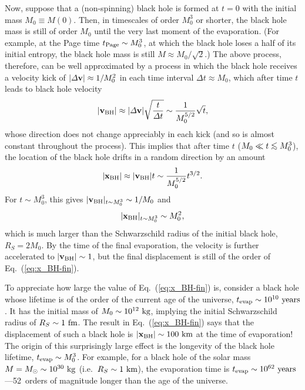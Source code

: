 \documentclass[12pt]{article}
\begin{document}
Now, suppose that a (non-spinning) black hole is formed at $t=0$ with 
the initial mass $M_0 \equiv M(0)$.  Then, in timescales of order $M_0^3$ 
or shorter, the black hole mass is still of order $M_0$ until the very last 
moment of the evaporation.  (For example, at the Page time $t_{\rm Page} 
\sim M_0^3$, at which the black hole loses a half of its initial entropy, 
the black hole mass is still $M \approx M_0/\sqrt{2}$.)  The above process, 
therefore, can be well approximated by a process in which the black hole 
receives a velocity kick of $|\varDelta {\bf v}| \approx 1/M_0^2$ in each 
time interval $\varDelta t \approx M_0$, which after time $t$ leads to 
black hole velocity
%
\begin{equation}
  |{\bf v}_{\rm BH}| \approx |\varDelta {\bf v}| 
    \sqrt{\frac{t}{\varDelta t}} \sim \frac{1}{M_0^{5/2}}\sqrt{t},
\label{eq:v_BH}
\end{equation}
%
whose direction does not change appreciably in each kick (and so is almost 
constant throughout the process).  This implies that after time $t$ ($M_0 
\ll t \simlt M_0^3$), the location of the black hole drifts in a random 
direction by an amount
%
\begin{equation}
  |{\bf x}_{\rm BH}| \approx |{\bf v}_{\rm BH}| t 
    \sim \frac{1}{M_0^{5/2}} t^{3/2}.
\label{eq:x_BH}
\end{equation}
%
For $t \sim M_0^3$, this gives $|{\bf v}_{\rm BH}|_{t \sim M_0^3} \sim 
1/M_0$ and
%
\begin{equation}
  |{\bf x}_{\rm BH}|_{t \sim M_0^3} \sim M_0^2,
\label{eq:x_BH-fin}
\end{equation}
%
which is much larger than the Schwarzschild radius of the initial black 
hole, $R_S = 2M_0$.  By the time of the final evaporation, the velocity 
is further accelerated to $|{\bf v}_{\rm BH}| \sim 1$, but the final 
displacement is still of the order of Eq.~(\ref{eq:x_BH-fin}).

To appreciate how large the value of Eq.~(\ref{eq:x_BH-fin}) is, consider 
a black hole whose lifetime is of the order of the current age of the 
universe, $t_{\rm evap} \sim 10^{10}~{\rm years}$.  It has the initial 
mass of $M_0 \sim 10^{12}~{\rm kg}$, implying the initial Schwarzschild 
radius of $R_S \sim 1~{\rm fm}$.  The result in Eq.~(\ref{eq:x_BH-fin}) 
says that the displacement of such a black hole is $|{\bf x}_{\rm BH}| 
\sim 100~{\rm km}$ at the time of evaporation!  The origin of this 
surprisingly large effect is the longevity of the black hole lifetime, 
$t_{\rm evap} \sim M_0^3$.  For example, for a black hole of the solar 
mass $M = M_\odot \sim 10^{30}~{\rm kg}$ (i.e.\ $R_S \sim 1~{\rm km}$), 
the evaporation time is $t_{\rm evap} \sim 10^{62}~{\rm years}$---52~orders 
of magnitude longer than the age of the universe.
\end{document}
